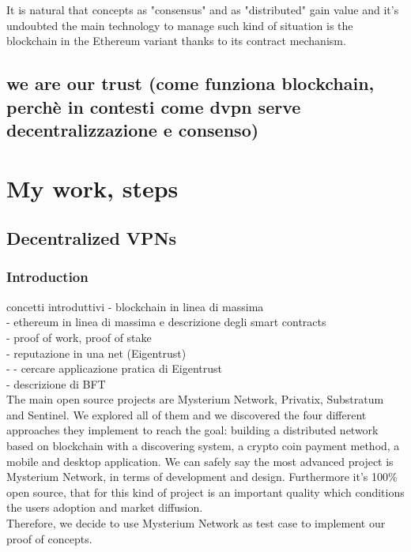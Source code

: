 \documentclass[]{article}
\begin{document}
	It is natural that concepts as "consensus" and as "distributed" gain value and it's undoubted the main technology to manage such kind of situation is the blockchain in the Ethereum variant thanks to its contract mechanism.\\
	
	\subsection{we are our trust (come funziona blockchain, perchè in contesti come dvpn serve decentralizzazione e consenso)}
	
	\section{My work, steps}
	\subsection{Decentralized VPNs}
	\subsubsection{Introduction}
		
	concetti introduttivi
	- blockchain in linea di massima\\
	- ethereum in linea di massima e descrizione degli smart contracts\\
	- proof of work, proof of stake\\
	- reputazione in una net (Eigentrust)\\
	- - cercare applicazione pratica di Eigentrust\\
	- descrizione di BFT\\
	
	The main open source projects are Mysterium Network, Privatix, Substratum and Sentinel. We explored all of them and we discovered the four different approaches they implement to reach the goal: building a distributed network based on blockchain with a discovering system, a crypto coin payment method, a mobile and desktop application. We can safely say the most advanced project is Mysterium Network, in terms of development and design. Furthermore it's 100\% open source, that for this kind of project is an important quality which conditions the users adoption and market diffusion.\\
	Therefore, we decide to use Mysterium Network as test case to implement our proof of concepts.\\
	
\end{document}
